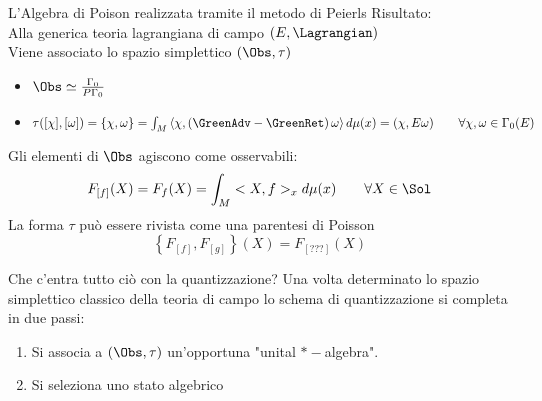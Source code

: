 \documentclass[8pt,handout]{beamer}
\begin{document}
	\begin{frame}{L'Algebra di Poison realizzata tramite il metodo di Peierls}
		Risultato:\\
		Alla generica teoria lagrangiana di campo $(E, \Lagrangian)$\\
		Viene associato lo spazio simplettico  $(\Obs, \tau)$ 
		\begin{itemize}
			\item $\Obs \simeq \frac{\Gamma_0}{P \Gamma_0} $
			\item $\tau( [\chi], [\omega]) = \{\chi , \omega \} =\int_M \left\langle\chi, \left(\GreenAdv - \GreenRet \right)\omega \right\rangle 
			d\mu(x) = ( \chi, E \omega) \qquad \forall \chi,\omega \in \Gamma_0(E)$
		\end{itemize}

		\vfill

		Gli elementi di $\Obs$ agiscono come osservabili:
				\begin{displaymath}
				 F_{[f]}(X) = F_f (X)= \int_M <X, f>_x d\mu(x) \qquad \forall X \in \Sol
				\end{displaymath}
		La forma $\tau$ può essere rivista come una parentesi di Poisson
				\begin{displaymath}
				 \left\{ F_{[f]},  F_{[g]} \right\} (X) = F_{[???]}(X)
				\end{displaymath}
			
	\end{frame}


	\begin{frame}{Che c'entra tutto ciò con la quantizzazione?}
		Una volta determinato lo spazio simplettico classico della teoria di campo lo schema di quantizzazione si completa in due passi:
		\begin{enumerate}
			\item Si associa a $(\Obs, \tau)$ un'opportuna  "unital $\ast-$algebra". 
			\item Si seleziona uno stato algebrico  
		\end{enumerate}
	\end{frame}
	
\end{document}
